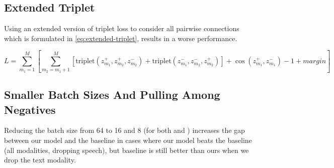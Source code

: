 







\subsection{Extended Triplet}
Using an extended version of triplet loss to consider all pairwise connections which is formulated in \cref{eq:extended-triplet}, results in a worse performance.

\begin{equation}\label{eq:extended-triplet}
    L = \sum_{m_1=1}^{M} \left[ \sum_{m_2=m_1+1}^{M} \left[ \text{triplet}(z_{m_1}^{+}, z_{m_2}^{+}, z_{m_2}^{-}) + \text{triplet}(z_{m_1}^{-}, z_{m_2}^{-}, z_{m_2}^{+}) \right] + \cos(z_{m_1}^{+}, z_{m_1}^{-}) -1 + margin \right]
\end{equation}





\subsection{Smaller Batch Sizes And Pulling Among Negatives}

Reducing the batch size from 64 to 16 and 8 (for both \ours{} and \supcon{}) increases the gap between our model and the baseline in cases where our model beats the baseline (all modalities, dropping speech), but baseline is still better than ours when we drop the text modality.


